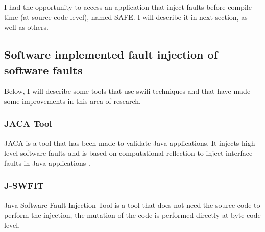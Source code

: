 




I had the opportunity to access an application that inject faults before compile time (at source code level), named SAFE. I will describe it in next section, as well as others.

\clearpage
\subsection{Software implemented fault injection of software faults}

Below, I will describe some tools that use \ac{swifi} techniques and that have made some improvements in this area of research.

\subsubsection{JACA Tool}

JACA\cite{regina2003jaca} is a tool that has been made to validate Java applications. It injects high-level software faults and is based on computational reflection to inject interface faults in Java applications
\cite{martins2002jaca}. \\

\subsubsection{J-SWFIT}

Java Software Fault Injection Tool\cite{sanches2011j} is a tool that does not need the source code to perform the injection, the mutation of the code is performed directly at byte-code level.\\


